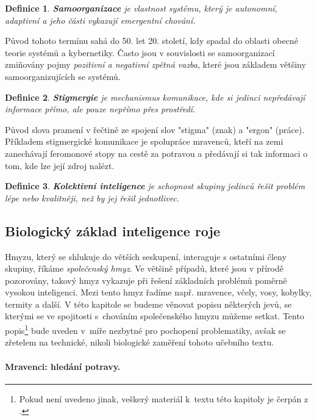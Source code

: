 \documentclass[a4paper,12pt]{article}
\newtheorem{define}{Definice}
\begin{document}
\begin{define}
  {\bf Samoorganizace} je vlastnost systému, který je autonomní, adaptivní a jeho 
  části vykazují emergentní chování. \cite{Wuchner07}
\end{define}
Původ tohoto termínu sahá do 50. let 20. století, kdy spadal do oblasti obecné teorie
systémů a kybernetiky. Často jsou v souvislosti se samoorganizací zmiňovány pojmy
{\it pozitivní a negativní zpětná vazba}, které jsou základem většiny samoorganizujících
se systémů.

\begin{define} \label{def:stig}
  {\bf Stigmergie} je mechanismus komunikace, kde si jedinci nepředávají informace přímo,
  ale pouze nepřímo přes prostředí. \cite[s.6]{Heylighen99}
\end{define}
Původ slova pramení v řečtině ze spojení slov "stigma" (znak) a "ergon" (práce). Příkladem
stigmergické komunikace je spolupráce mravenců, kteří na zemi zanechávají feromonové stopy
na cestě za potravou a předávají si tak informaci o tom, kde lze její zdroj nalézt.

\begin{define}
  {\bf Kolektivní inteligence} je schopnost skupiny jedinců řešit problém lépe nebo kvalitněji,
  než by jej řešil jednotlivec. \cite[s.1]{Heylighen99}
\end{define}


\subsection{Biologický základ inteligence roje} \label{sub:biolzakl}
Hmyzu, který se shlukuje do větších seskupení, interaguje s ostatními členy skupiny,
říkáme {\it společenský hmyz}. Ve většině případů, které jsou v přírodě pozorovány,
takový hmyz vykazuje při řešení základních problémů poměrně vysokou inteligenci. Mezi
tento hmyz řadíme např. mravence, včely, vosy, kobylky, termity a další. V této
kapitole se budeme věnovat popisu některých jevů, se kterými se ve spojitosti s~chováním
společenského hmyzu můžeme setkat. Tento popis\footnote{Pokud není uvedeno jinak, veškerý
materiál k~textu této kapitoly je čerpán z \cite{Beekman08SwarmBio}.} bude uveden v~míře
nezbytné pro pochopení problematiky, avšak se zřetelem na technické, nikoli biologické
zaměření tohoto učebního textu.

\paragraph{Mravenci: hledání potravy.}
\end{document}
